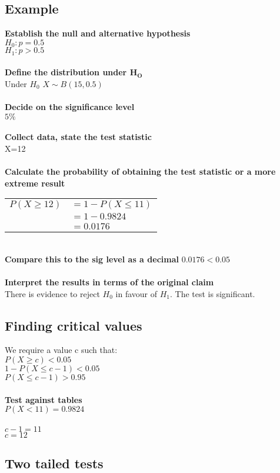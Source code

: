 \documentclass{article}[18pt]
\begin{document}
\subsection{Example}
\textbf{Establish the null and alternative hypothesis}\\
$H_0:p=0.5$\\
$H_1:p>0.5$\\
\\
\textbf{Define the distribution under $\mathbf{H_O}$}\\
Under $H_0$ $X\sim B(15,0.5)$\\
\\
\textbf{Decide on the significance level}\\
$5\%$\\
\\
\textbf{Collect data, state the test statistic}\\
X=12\\
\\
\textbf{Calculate the probability of obtaining the test statistic or a more extreme result}\\
\begin{tabular}{r l}
$P(X\geqslant 12)$&$=1-P(X\leqslant 11)$\\
&$=1-0.9824$\\
&$=0.0176$\\
\end{tabular}
\\
\textbf{Compare this to the sig level as a decimal}
$0.0176<0.05$\\
\\
\textbf{Interpret the results in terms of the original claim}\\
There is evidence to reject $H_0$ in favour of $H_1$. The test is significant.
\subsection{Finding critical values}
We require a value c such that:\\
$P(X\geqslant c)<0.05$\\
$1-P(X\leqslant c-1)<0.05$\\
$P(X\leqslant c-1)>0.95$\\
\\
\textbf{Test against tables}\\
$P(X<11)=0.9824$\\
\\
$c-1=11$\\
$c=12$
\subsection{Two tailed tests}
\end{document}

